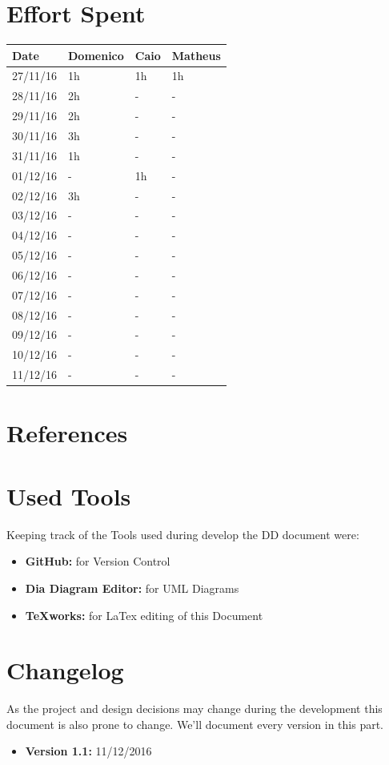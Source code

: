 \documentclass[a4paper]{article}
\begin{document}
\section{Effort Spent}
\begin{tabular}{ | l | l | l | l | }
\hline
	\textbf {Date} & \textbf {Domenico} & \textbf {Caio} & \textbf {Matheus} \\ \hline
	27/11/16& 1h & 1h & 1h  \\ \hline
	28/11/16& 2h & - & - \\ \hline
	29/11/16& 2h & - & - \\ \hline
	30/11/16& 3h & - & - \\ \hline
	31/11/16& 1h & - & - \\ \hline
	01/12/16& - & 1h & - \\ \hline
	02/12/16& 3h & - & - \\ \hline
	03/12/16& - & - & - \\ \hline
	04/12/16& - & - & - \\ \hline
	05/12/16& - & - & - \\ \hline
	06/12/16& - & - & - \\ \hline
	07/12/16& - & - & - \\ \hline
	08/12/16& - & - & - \\ \hline
	09/12/16& - & - & - \\ \hline
	10/12/16& - & - & - \\ \hline
	11/12/16& - & - & - \\ \hline
\end{tabular}
\newpage

\section{References}
\newpage


\section{Used Tools}
Keeping track of the Tools used during develop the DD document were:
\begin{itemize}
	\item \textbf{GitHub:} for Version Control
	\item \textbf {Dia Diagram Editor:} for UML Diagrams
	\item \textbf {TeXworks:} for LaTex editing of this Document
\end{itemize}
\newpage

\section{Changelog}
As the project and design decisions may change during the development this document is also prone to change.
We'll document every version in this part.
\begin{itemize}
\item \textbf {Version 1.1:} 11/12/2016
\end{itemize}
\end{document}
